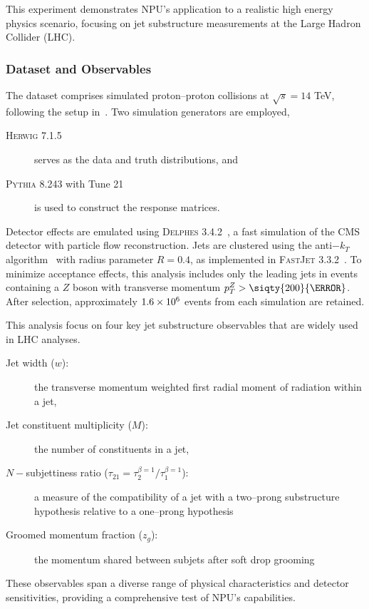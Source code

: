     This experiment demonstrates NPU's application to a realistic high energy physics scenario, focusing on jet substructure measurements at the Large Hadron Collider (LHC).
    
    \subsubsection{Dataset and Observables}
        The dataset comprises simulated proton--proton collisions at $\sqrt{s} = 14$ TeV, following the setup in~\cite{andreassen_omnifold_2020}.
        Two simulation generators are employed,
        \begin{description}
            \item[\textsc{Herwig 7.1.5}~\cite{Bellm2017HerwigNote}] serves as the data and truth distributions, and
            \item[\textsc{Pythia 8.243} with Tune 21~\cite{bierlich_comprehensive_2022}] is used to construct the response matrices.
        \end{description}
        
        Detector effects are emulated using \textsc{Delphes 3.4.2}~\cite{DeFavereau2014DELPHESExperiment}, a fast simulation of the CMS detector with particle flow reconstruction.
        Jets are clustered using the anti$-k_T$ algorithm~\cite{Cacciari2008TheAlgorithm} with radius parameter $R = 0.4$, as implemented in \textsc{FastJet 3.3.2}~\cite{Cacciari2012FastJetManual}.
        To minimize acceptance effects, this analysis includes only the leading jets in events containing a \(Z\) boson with transverse momentum \(p_T^Z > \siqty{200}{\GeV}\).
        After selection, approximately \(\num{1.6d6}\) events from each simulation are retained.

        This analysis focus on four key jet substructure observables that are widely used in LHC analyses.
        \begin{description}
            \item [Jet width (\(w\)):] the transverse momentum weighted first radial moment of radiation within a jet,
            \item [Jet constituent multiplicity ($M$):] the number of constituents in a jet,
            \item [\(N-\)subjettiness ratio ($\tau_{21} = \tau_2^{\beta=1}/\tau_1^{\beta=1}$):] a measure of the compatibility of a jet with a two--prong substructure hypothesis relative to a one--prong hypothesis~\cite{Thaler2011IdentifyingN-subjettiness, Thaler2012MaximizingN-subjettiness, DevNairDevelopmentData}
            \item [Groomed momentum fraction ($z_g$):] the momentum shared between subjets after soft drop grooming~\cite{Larkoski2014SoftDrop, Dasgupta2013TowardsSubstructure}
        \end{description}
        These observables span a diverse range of physical characteristics and detector sensitivities, providing a comprehensive test of NPU's capabilities.
